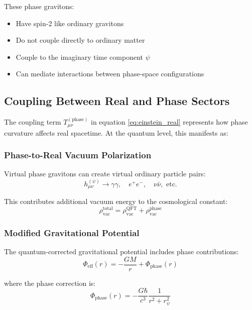\documentclass[12pt]{article}
\begin{document}
These phase gravitons:
\begin{itemize}
    \item Have spin-2 like ordinary gravitons
    \item Do not couple directly to ordinary matter
    \item Couple to the imaginary time component $\psi$
    \item Can mediate interactions between phase-space configurations
\end{itemize}

\subsection{Coupling Between Real and Phase Sectors}

The coupling term $T_{\mu\nu}^{(\text{phase})}$ in equation \eqref{eq:einstein_real} represents how phase curvature affects real spacetime. At the quantum level, this manifests as:

\subsubsection{Phase-to-Real Vacuum Polarization}

Virtual phase gravitons can create virtual ordinary particle pairs:
\begin{equation}
    h^{(\psi)}_{\mu\nu} \to \gamma\gamma, \quad e^+e^-, \quad \nu\bar{\nu}, \text{ etc.}
\end{equation}

This contributes additional vacuum energy to the cosmological constant:
\begin{equation}
    \rho_{\text{vac}}^{\text{total}} = \rho_{\text{vac}}^{\text{QFT}} + \rho_{\text{vac}}^{\text{phase}}
\end{equation}

\subsubsection{Modified Gravitational Potential}

The quantum-corrected gravitational potential includes phase contributions:
\begin{equation}
    \Phi_{\text{eff}}(r) = -\frac{GM}{r} + \Phi_{\text{phase}}(r)
\end{equation}

where the phase correction is:
\begin{equation}
    \Phi_{\text{phase}}(r) = -\frac{G\hbar}{c^3} \frac{1}{r^2 + r_\psi^2}
\end{equation}
\end{document}
